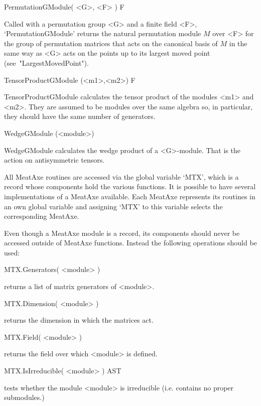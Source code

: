 \>PermutationGModule( <G>, <F> ) F

Called with a permutation group <G> and a finite field <F>,
`PermutationGModule' returns the natural permutation module $M$ over <F>
for the group of permutation matrices that acts on the canonical basis of $M$
in the same way as <G> acts on the points up to its largest moved point
(see~"LargestMovedPoint").

\>TensorProductGModule (<m1>,<m2>) F

TensorProductGModule calculates the tensor product of the modules
<m1> and <m2>. 
They are assumed to be modules over the same algebra so, in particular,
they  should have the same number of generators.

\>WedgeGModule (<module>)

WedgeGModule calculates the wedge product of a <G>-module.
That is the action on antisymmetric tensors.



All MeatAxe routines are accessed via the global variable `MTX', which is a
record whose components hold the various functions. It is possible to have
several implementations of a MeatAxe available. Each MeatAxe represents its
routines in an own global variable and assigning `MTX' to this variable
selects the corresponding MeatAxe.


Even though a MeatAxe module is a record, its components should never be
accessed outside of MeatAxe functions. Instead the following operations
should be used:

\>MTX.Generators( <module> )

returns a list of matrix generators of <module>.

\>MTX.Dimension( <module> )

returns the dimension in which the matrices act.

\>MTX.Field( <module> )

returns the field over which <module> is defined.


\>MTX.IsIrreducible( <module> ) AST

tests whether the module <module> is irreducible (i.e. contains no proper
submodules.)

